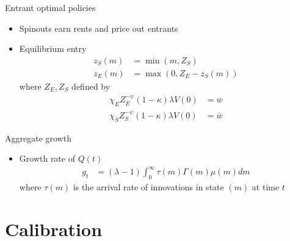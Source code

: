 \documentclass[english,usenames,dvipsnames]{beamer}
\begin{document}
\begin{frame}{Entrant optimal policies}
\begin{itemize}
\item Spinouts earn rents and price out entrants
\item Equilibrium entry
\begin{align*}
z_S(m) &= \min(m,Z_S) \\
z_E(m) &= \max(0, Z_E - z_S(m))
\end{align*} 
where $Z_E,Z_S$ defined by
\begin{align*}
\chi_E Z_E^{-\psi} (1-\kappa) \lambda V(0) &= \bar{w} \\
\chi_S Z_S^{-\psi} (1-\kappa) \lambda V(0) &= \bar{w} 
\end{align*}
\end{itemize}
\end{frame}


\begin{frame}{Aggregate growth}
\begin{itemize}
\item Growth rate of $Q(t)$
\begin{align*}
g_t &= (\lambda -1) \int_0^{\infty} \tau(m) \Gamma(m) \mu(m) dm
\end{align*}
where $\tau(m)$ is the arrival rate of innovations in state $(m)$ at time $t$
\end{itemize}
\end{frame}


\section{Calibration}


\begin{frame}
\tableofcontents[currentsection]
\end{frame}
\end{document}

